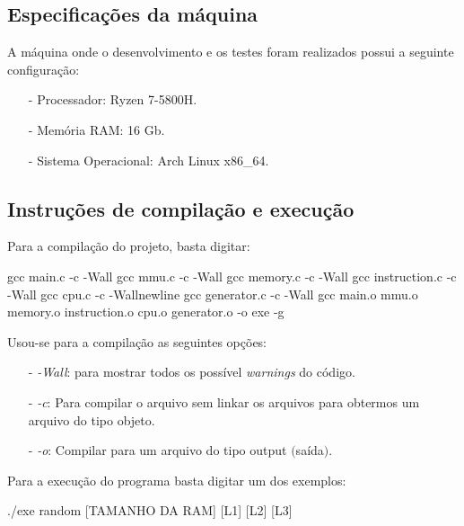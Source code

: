\documentclass{article}
\begin{document}
\subsection{Especificações da máquina}
A máquina onde o desenvolvimento e os testes foram realizados possui a seguinte configuração:

\begin{itemize}
    \item[-] Processador: Ryzen 7-5800H.
    \item[-] Memória RAM: 16 Gb.
    \item[-] Sistema Operacional: Arch Linux x86\_64.
\end{itemize}


\subsection{Instruções de compilação e execução}

Para a compilação do projeto, basta digitar:

\begin{tcolorbox}[title=Compilando o projeto,width=\linewidth]
    gcc main.c -c -Wall \newline
    gcc mmu.c -c -Wall \newline
    gcc memory.c -c -Wall\newline
    gcc instruction.c -c -Wall\newline
    gcc cpu.c -c -Wallnewline
    gcc generator.c -c -Wall\newline
    gcc main.o mmu.o memory.o instruction.o cpu.o generator.o -o exe -g
\end{tcolorbox}

Usou-se para a compilação as seguintes opções:

\begin{itemize}
    \item [-] \emph{-Wall}: para mostrar todos os possível \emph{warnings} do código.
    \item [-] \emph{-c}: Para compilar o arquivo sem linkar os arquivos para obtermos um arquivo do tipo objeto.
    \item [-] \emph{-o}: Compilar para um arquivo do tipo output $($saída$)$.
\end{itemize}

Para a execução do programa basta digitar um dos exemplos:
\begin{tcolorbox}[title=,width=\linewidth]
    ./exe random [TAMANHO DA RAM] [L1] [L2] [L3] \newline


\end{tcolorbox}
\end{document}
